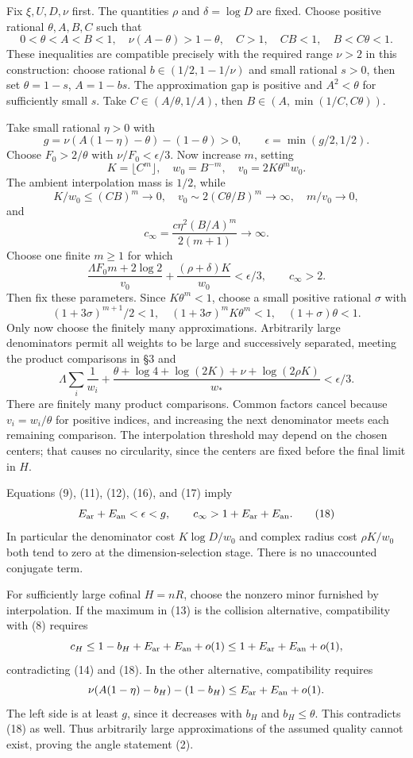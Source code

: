\documentclass[11pt]{article}
\begin{document}
Fix \(\xi,U,D,\nu\) first. The quantities \(\rho\) and \(\delta=\log D\)
are fixed. Choose positive rational \(\theta,A,B,C\) such that \[
0<\theta<A<B<1,\quad
\nu(A-\theta)>1-\theta,\quad
C>1,\quad CB<1,\quad B<C\theta<1.
\tag{15}
\] These inequalities are compatible precisely with the required range
\(\nu>2\) in this construction: choose rational \(b\in(1/2,1-1/\nu)\)
and small rational \(s>0\), then set \(\theta=1-s\), \(A=1-bs\). The
approximation gap is positive and \(A^2<\theta\) for sufficiently small
\(s\). Take \(C\in(A/\theta,1/A)\), then \(B\in(A,\min(1/C,C\theta))\).

Take small rational \(\eta>0\) with \[
g=\nu(A(1-\eta)-\theta)-(1-\theta)>0,
\qquad \epsilon=\min(g/2,1/2).
\] Choose \(F_0>2/\theta\) with \(\nu/F_0<\epsilon/3\). Now increase
\(m\), setting \[
K=\lfloor C^m\rfloor,\quad w_0=B^{-m},\quad
v_0=2K\theta^mw_0.
\] The ambient interpolation mass is \(1/2\), while \[
K/w_0\le(CB)^m\to0,\quad
v_0\sim2(C\theta/B)^m\to\infty,\quad m/v_0\to0,
\] and \[
c_\infty=\frac{c\eta^2(B/A)^m}{2(m+1)}\to\infty.
\] Choose one finite \(m\ge1\) for which \[
\frac{\Lambda F_0m+2\log2}{v_0}
+\frac{(\rho+\delta)K}{w_0}<\epsilon/3,
\qquad c_\infty>2.
\tag{16}
\] Then fix these parameters. Since \(K\theta^m<1\), choose a small
positive rational \(\sigma\) with \[
(1+3\sigma)^{m+1}/2<1,\quad
(1+3\sigma)^mK\theta^m<1,\quad
(1+\sigma)\theta<1.
\] Only now choose the finitely many approximations. Arbitrarily large
denominators permit all weights to be large and successively separated,
meeting the product comparisons in §3 and \[
\Lambda\sum_i\frac1{w_i}+
\frac{\theta+\log4+\log(2K)+\nu+\log(2\rho K)}{w_*}<\epsilon/3.
\tag{17}
\] There are finitely many product comparisons. Common factors cancel
because \(v_i=w_i/\theta\) for positive indices, and increasing the next
denominator meets each remaining comparison. The interpolation threshold
may depend on the chosen centers; that causes no circularity, since the
centers are fixed before the final limit in \(H\).

Equations (9), (11), (12), (16), and (17) imply \[
E_{\rm ar}+E_{\rm an}<\epsilon<g,\qquad
c_\infty>1+E_{\rm ar}+E_{\rm an}.
\tag{18}
\] In particular the denominator cost \(K\log D/w_0\) and complex radius
cost \(\rho K/w_0\) both tend to zero at the dimension-selection stage.
There is no unaccounted conjugate term.

For sufficiently large cofinal \(H=nR\), choose the nonzero minor
furnished by interpolation. If the maximum in (13) is the collision
alternative, compatibility with (8) requires \[
c_H\le1-b_H+E_{\rm ar}+E_{\rm an}+o(1)
\le1+E_{\rm ar}+E_{\rm an}+o(1),
\] contradicting (14) and (18). In the other alternative, compatibility
requires \[
\nu(A(1-\eta)-b_H)-(1-b_H)
\le E_{\rm ar}+E_{\rm an}+o(1).
\] The left side is at least \(g\), since it decreases with \(b_H\) and
\(b_H\le\theta\). This contradicts (18) as well. Thus arbitrarily large
approximations of the assumed quality cannot exist, proving the angle
statement (2).
\end{document}
